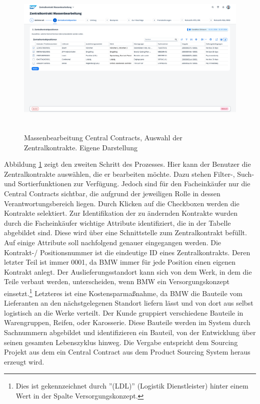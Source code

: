 \begin{figure}[H]
    \centering
    \includegraphics[height=7.66cm]{Bilder/Praxisteil-KL-Schritt-2.png}
    \caption[Massenbearbeitung Central Contracts, Auswahl der Zentralkontrakte]{Massenbearbeitung Central Contracts, Auswahl der Zentralkontrakte. Eigene Darstellung}
    \label{fig:PraxisKLSchritt2}
\end{figure}

Abbildung \ref{fig:PraxisKLSchritt2} zeigt den zweiten Schritt des Prozesses. Hier kann der Benutzer die Zentralkontrakte auswählen, die er bearbeiten möchte. Dazu stehen Filter-, Such- und Sortierfunktionen zur Verfügung. Jedoch sind für den Facheinkäufer nur die Central Contracts sichtbar, die aufgrund der jeweiligen Rolle in dessen Verantwortungsbereich liegen. Durch Klicken auf die Checkboxen werden die Kontrakte selektiert. Zur Identifikation der zu ändernden Kontrakte wurden durch die Facheinkäufer wichtige Attribute identifiziert, die in der Tabelle abgebildet sind. Diese wird über eine Schnittstelle zum Zentralkontrakt befüllt. Auf einige Attribute soll nachfolgend genauer eingegangen werden. Die Kontrakt-/ Positionsnummer ist die eindeutige ID eines Zentralkontrakts. Deren letzter Teil ist immer 0001, da BMW immer für jede Position einen eigenen Kontrakt anlegt. Der Auslieferungsstandort kann sich von dem Werk, in dem die Teile verbaut werden, unterscheiden, wenn BMW ein Versorgungskonzept einsetzt.\footnote{Dies ist gekennzeichnet durch ''(LDL)'' (Logistik Dienstleister) hinter einem Wert in der Spalte Versorgungskonzept.} Letzteres ist eine Kostensparmaßnahme, da BMW die Bauteile vom Lieferanten an den nächstgelegenen Standort liefern lässt und von dort aus selbst logistisch an die Werke verteilt. Der Kunde gruppiert verschiedene Bauteile in Warengruppen, \zB Reifen, oder Karosserie. Diese Bauteile werden im System durch Sachnummern abgebildet und identifizieren ein Bauteil, von der Entwicklung über seinen gesamten Lebenszyklus hinweg. Die Vergabe entspricht dem Sourcing Projekt aus dem ein Central Contract aus dem Product Sourcing System heraus erzeugt wird. 

